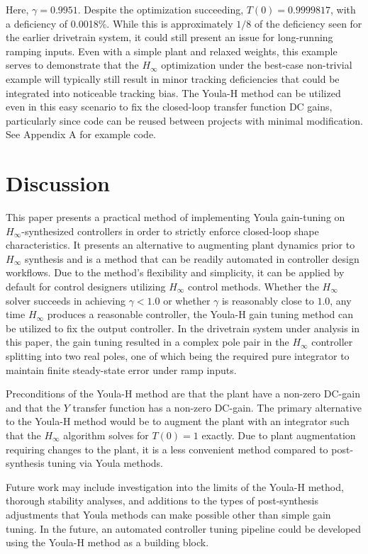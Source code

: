 \documentclass[journal,article,submit,pdftex,moreauthors]{Definitions/mdpi}
\begin{document}
Here, $\gamma = 0.9951$. Despite the optimization succeeding, $T(0) = 0.9999817$, with a deficiency of 0.0018\%. While this is approximately $1/8$ of the deficiency seen for the earlier drivetrain system, it could still present an issue for long-running ramping inputs. Even with a simple plant and relaxed weights, this example serves to demonstrate that the $H_\infty$ optimization under the best-case non-trivial example will typically  still result in minor tracking deficiencies that could be integrated into noticeable tracking bias. The Youla-H method can be utilized even in this easy scenario to fix the closed-loop transfer function DC gains, particularly since code can be reused between projects with minimal modification. See Appendix A for example code.

\section{Discussion}

This paper presents a practical method of implementing Youla gain-tuning on $H_\infty$-synthesized controllers in order to strictly enforce closed-loop shape characteristics. It presents an alternative to augmenting plant dynamics prior to $H_\infty$ synthesis and is a method that can be readily automated in controller design workflows. Due to the method's flexibility and simplicity, it can be applied by default for control designers utilizing $H_\infty$ control methods. Whether the $H_\infty$ solver succeeds in achieving $\gamma<1.0$ or whether $\gamma$ is reasonably close to $1.0$, any time $H_\infty$ produces a reasonable controller, the Youla-H gain tuning method can be utilized to fix the output controller. In the drivetrain system under analysis in this paper, the gain tuning resulted in a complex pole pair in the $H_\infty$ controller splitting into two real poles, one of which being the required pure integrator to maintain finite steady-state error under ramp inputs.

Preconditions of the Youla-H method are that the plant have a non-zero DC-gain and that the $Y$ transfer function has a non-zero DC-gain. The primary alternative to the Youla-H method would be to augment the plant with an integrator such that the $H_\infty$ algorithm solves for $T(0)=1$ exactly. Due to plant augmentation requiring changes to the plant, it is a less convenient method compared to post-synthesis tuning via Youla methods.

Future work may include investigation into the limits of the Youla-H method, thorough stability analyses, and additions to the types of post-synthesis adjustments that Youla methods can make possible other than simple gain tuning. In the future, an automated controller tuning pipeline could be developed using the Youla-H method as a building block.
\end{document}
